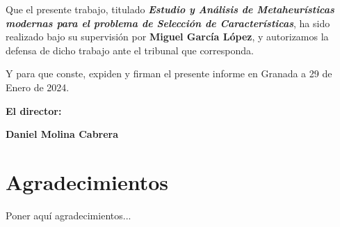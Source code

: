 Que el presente trabajo, titulado \textit{\textbf{Estudio y Análisis de Metaheurísticas modernas para el problema de Selección de Características}},
ha sido realizado bajo su supervisión por \textbf{Miguel García López}, y autorizamos la defensa de dicho trabajo ante el tribunal
que corresponda.

\vspace{0.5cm}

Y para que conste, expiden y firman el presente informe en Granada a 29 de Enero de 2024.

\vspace{1cm}

\textbf{El director:}

\vspace{5cm}

\noindent \textbf{Daniel Molina Cabrera}

\chapter*{Agradecimientos}
\thispagestyle{empty}

\vspace{1cm}


Poner aquí agradecimientos...

